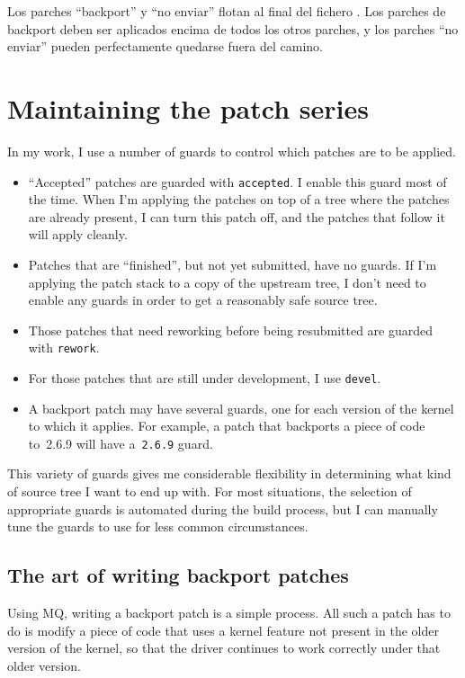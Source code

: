 Los parches ``backport'' y ``no enviar'' flotan al final del fichero
. Los parches de backport deben ser aplicados encima
de todos los otros parches, y los parches ``no enviar'' pueden
perfectamente quedarse fuera del camino.

\section{Maintaining the patch series}

In my work, I use a number of guards to control which patches are to
be applied.

\begin{itemize}
\item ``Accepted'' patches are guarded with \texttt{accepted}.  I
  enable this guard most of the time.  When I'm applying the patches
  on top of a tree where the patches are already present, I can turn
  this patch off, and the patches that follow it will apply cleanly.
\item Patches that are ``finished'', but not yet submitted, have no
  guards.  If I'm applying the patch stack to a copy of the upstream
  tree, I don't need to enable any guards in order to get a reasonably
  safe source tree.
\item Those patches that need reworking before being resubmitted are
  guarded with \texttt{rework}.
\item For those patches that are still under development, I use
  \texttt{devel}.
\item A backport patch may have several guards, one for each version
  of the kernel to which it applies.  For example, a patch that
  backports a piece of code to~2.6.9 will have a~\texttt{2.6.9} guard.
\end{itemize}
This variety of guards gives me considerable flexibility in
determining what kind of source tree I want to end up with.  For most
situations, the selection of appropriate guards is automated during
the build process, but I can manually tune the guards to use for less
common circumstances.

\subsection{The art of writing backport patches}

Using MQ, writing a backport patch is a simple process.  All such a
patch has to do is modify a piece of code that uses a kernel feature
not present in the older version of the kernel, so that the driver
continues to work correctly under that older version.

